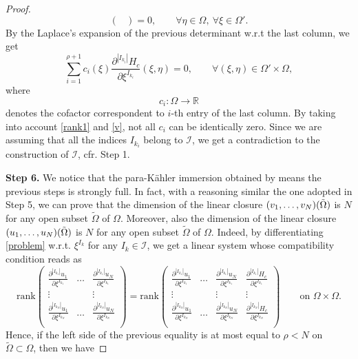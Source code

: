 \documentclass{article}
\newcommand{\I}{\mathcal{I}}
\newcommand{\R}{\mathds{R}}
\newcommand{\de}{\partial}
\newcommand{\pk}{para-K\"ahler }
\begin{document}
\begin{proof}
$$\begin{pmatrix}
\end{pmatrix}= 0,\qquad \forall \eta\in\Omega,\ \forall \xi\in\Omega'.$$
By the Laplace's expansion of the previous determinant w.r.t the last column, we get
\begin{equation}\label{restr.eq} \sum_{i=1}^{\rho+1} c_i(\xi) \frac{\de^{|I_{k_i} | }H_c}{\de \xi^{I_{k_i}}}(\xi,\eta)=0, \qquad \forall (\xi,\eta)\in\Omega'\times\Omega,\end{equation}
where $$c_i:\Omega\to\R$$ denotes the cofactor correspondent to $i$-th entry of the last column. 
By taking into account \eqref{rank1} and \eqref{v}, not all $c_i$ can be identically zero. 
Since we are assuming that all the indices $I_{k_i}$ belong to $\I$, we get a contradiction to the construction of $\I$, cfr. Step 1.


\medskip\noindent
\textbf{\large Step 6.} 
We notice that the \pk immersion obtained by means the previous steps is strongly full. In fact, with a reasoning similar the one adopted in Step 5, we can prove that the dimension of the linear closure $(v_1,\mathellipsis,v_N)(\tilde\Omega)$ is $N$ for any open subset $\tilde\Omega$ of $\Omega$. Moreover, also the dimension of the linear closure $(u_1,\mathellipsis,u_N)(\tilde\Omega)$ is $N$ for any open subset $\tilde\Omega$ of $\Omega$. Indeed, by differentiating \eqref{problem} w.r.t. $\xi^{I_k}$ for any $I_k\in\I$, we get a linear system whose compatibility condition reads as
$$\mathrm{rank}\begin{pmatrix}
\frac{\de^{| I_{k_1}| }u_1}{\de \xi^{I_{k_1}}}&\dots& \frac{\de^{| I_{k_1}| }u_N}{\de \xi^{I_{k_1}}}\\
\vdots & &\vdots\\
\frac{\de^{|I_{k_N} | }u_1}{\de \xi^{I_{k_N}}}&\dots& \frac{\de^{|I_{k_N} | }u_N}{\de \xi^{I_{k_N}}}\\
\end{pmatrix}=\mathrm{rank}\begin{pmatrix}
\frac{\de^{| I_{k_1}| }u_1}{\de \xi^{I_{k_1}}}&\dots& \frac{\de^{| I_{k_1}| }u_N}{\de \xi^{I_{k_1}}}&\frac{\de^{|I_{k_1} | }H_c}{\de \xi^{I_{k_1}}}\\
\vdots & &\vdots&\vdots\\
\frac{\de^{|I_{k_N} | }u_1}{\de \xi^{I_{k_N}}}&\dots& \frac{\de^{|I_{k_N} | }u_N}{\de \xi^{I_{k_N}}}&\frac{\de^{| I_{k_N}| }H_c}{\de \xi^{I_{k_N}}}\\
\end{pmatrix} \qquad \text{on } \Omega\times\Omega.$$
Hence, if the left side of the previous equality is at most equal to $\rho<N$ on $\tilde\Omega\subset\Omega$, then we have

\end{proof}
\end{document}
